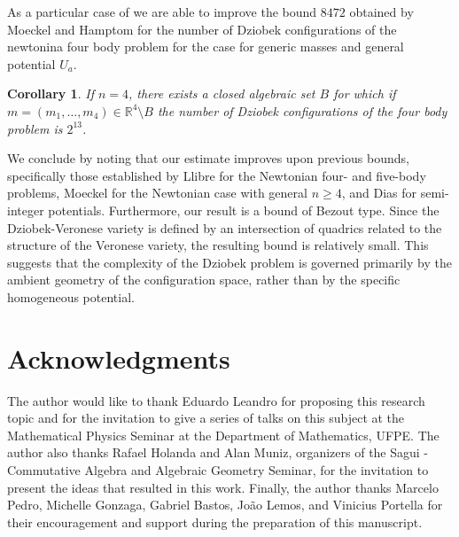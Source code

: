 \documentclass{amsart}
\newtheorem{corollary}[theorem]{Corollary}
\theoremstyle{definition}
\theoremstyle{remark}
\numberwithin{equation}{section}
\begin{document}
As a particular case of  we are able to improve the bound $8472$ obtained by Moeckel and Hamptom \cite{hampton2006finiteness} for the number of  Dziobek configurations of the newtonina four body problem   for the case   for generic masses and general potential $U_a$. 
 
\begin{corollary}
    If $n=4$, there exists a closed algebraic set $B$ for which if $m = (m_1, \dots, m_4) \in \mathbb{R}^4 \setminus B$ the number of Dziobek configurations of the four body problem is $2^{13}$.
\end{corollary}

We conclude by noting that our estimate improves upon previous bounds, specifically those established by Llibre \cite{llibre1990number} for the Newtonian four- and five-body problems, Moeckel \cite{moeckel2001generic} for the Newtonian case with general $n \geq 4$, and Dias \cite{dias2017new} for semi-integer potentials. Furthermore, our result is a bound of Bezout type. Since the Dziobek-Veronese variety is defined by an intersection of quadrics related to the structure of the Veronese variety, the resulting bound is relatively small. This suggests that the complexity of the Dziobek problem is governed primarily by the ambient geometry of the configuration space, rather than by the specific homogeneous potential.








\section*{Acknowledgments}

The author would like to thank Eduardo Leandro for proposing this research topic and for the invitation to give a series of talks on this subject at the Mathematical Physics Seminar at the Department of Mathematics, UFPE. The author also thanks Rafael Holanda and Alan Muniz, organizers of the Sagui - Commutative Algebra and Algebraic Geometry Seminar, for the invitation to present the ideas that resulted in this work. Finally, the author thanks Marcelo Pedro, Michelle Gonzaga, Gabriel Bastos, João Lemos, and Vinicius Portella for their encouragement and support during the preparation of this manuscript.






\end{document}
